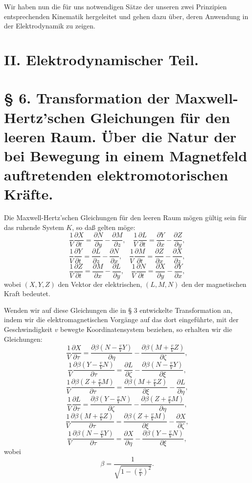 \documentclass[17pt]{webarticle}       %
\begin{document}
Wir haben nun die für uns notwendigen Sätze der unseren zwei Prinzipien entsprechenden Kinematik hergeleitet und gehen dazu über, deren Anwendung in der Elektrodynamik zu zeigen.

\section*{II. Elektrodynamischer Teil.}

\section*{§ 6. Transformation der Maxwell-Hertz'schen Gleichungen für den leeren Raum. Über die Natur der bei Bewegung in einem Magnetfeld auftretenden elektromotorischen Kräfte.}

Die Maxwell-Hertz'schen Gleichungen für den leeren Raum mögen gültig sein für das ruhende System \( K \), so daß gelten möge:
\[
\frac{1}{V} \frac{\partial X}{\partial t} = \frac{\partial N}{\partial y} - \frac{\partial M}{\partial z}, \quad \frac{1}{V} \frac{\partial L}{\partial t} = \frac{\partial Y}{\partial x} - \frac{\partial Z}{\partial y},
\]
\[
\frac{1}{V} \frac{\partial Y}{\partial t} = \frac{\partial L}{\partial z} - \frac{\partial N}{\partial x}, \quad \frac{1}{V} \frac{\partial M}{\partial t} = \frac{\partial Z}{\partial x} - \frac{\partial X}{\partial z},
\]
\[
\frac{1}{V} \frac{\partial Z}{\partial t} = \frac{\partial M}{\partial x} - \frac{\partial L}{\partial y}, \quad \frac{1}{V} \frac{\partial N}{\partial t} = \frac{\partial X}{\partial y} - \frac{\partial Y}{\partial x},
\]
wobei \( (X, Y, Z) \) den Vektor der elektrischen, \( (L, M, N) \) den der magnetischen Kraft bedeutet.

Wenden wir auf diese Gleichungen die in § 3 entwickelte Transformation an, indem wir die elektromagnetischen Vorgänge auf das dort eingeführte, mit der Geschwindigkeit \( v \) bewegte Koordinatensystem beziehen, so erhalten wir die Gleichungen:
\[
\frac{1}{V} \frac{\partial X}{\partial \tau} = \frac{\partial \beta \left( N - \frac{v}{V} Y \right)}{\partial \eta} - \frac{\partial \beta \left( M + \frac{v}{V} Z \right)}{\partial \zeta},
\]
\[
\frac{1}{V} \frac{\partial \beta \left( Y - \frac{v}{V} N \right)}{\partial \tau} = \frac{\partial L}{\partial \zeta} - \frac{\partial \beta \left( N - \frac{v}{V} Y \right)}{\partial \xi},
\]
\[
\frac{1}{V} \frac{\partial \beta \left( Z + \frac{v}{V} M \right)}{\partial \tau} = \frac{\partial \beta \left( M + \frac{v}{V} Z \right)}{\partial \xi} - \frac{\partial L}{\partial \eta},
\]
\[
\frac{1}{V} \frac{\partial L}{\partial \tau} = \frac{\partial \beta \left( Y - \frac{v}{V} N \right)}{\partial \zeta} - \frac{\partial \beta \left( Z + \frac{v}{V} M \right)}{\partial \eta},
\]
\[
\frac{1}{V} \frac{\partial \beta \left( M + \frac{v}{V} Z \right)}{\partial \tau} = \frac{\partial \beta \left( Z + \frac{v}{V} M \right)}{\partial \xi} - \frac{\partial X}{\partial \zeta},
\]
\[
\frac{1}{V} \frac{\partial \beta \left( N - \frac{v}{V} Y \right)}{\partial \tau} = \frac{\partial X}{\partial \eta} - \frac{\partial \beta \left( Y - \frac{v}{V} N \right)}{\partial \xi},
\]
wobei
\[
\beta = \frac{1}{\sqrt{1 - \left( \frac{v}{V} \right)^2}}.
\]
\end{document}
